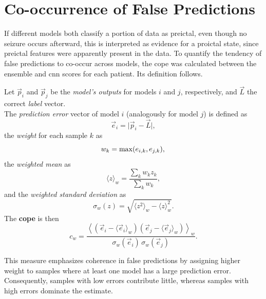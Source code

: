 \section{Co-occurrence of False Predictions} \label{sec:co-occurrence-of-false-predictions}
If different models both classify a portion of data as preictal, even though no seizure occurs afterward, this is interpreted as evidence for a proictal state, since preictal features were apparently present in the data.
To quantify the tendency of false predictions to co-occur across models, the \gls{cope} \parencite{muller_coherent_2022} was calculated between the ensemble and \gls{cnn} scores for each patient.
Its definition follows.

Let $\vec{p}_i$ and $\vec{p}_j$ be the \textit{model's outputs} for models $i$ and $j$, respectively, and $\vec{L}$ the correct \textit{label} vector.\\
The \textit{prediction error} vector of model $i$ (analogously for model $j$) is defined as
\begin{equation}
    \vec{e}_i=\lvert\vec{p}_i-\vec{L}\rvert,
\end{equation}
the \textit{weight} for each sample $k$ as
\begin{equation} 
    w_k = \max(e_{i,k},e_{j,k}),\\
\end{equation}
the \textit{weighted mean} as
\begin{equation}
    \langle z\rangle_w = \frac{\sum_k w_k z_k}{\sum_k w_k},
\end{equation}
and the \textit{weighted standard deviation} as
\begin{equation}
    \sigma_w(z) = \sqrt{\langle z^2\rangle_w-\langle z\rangle_w^2}.
\end{equation}
The \textbf{\gls{cope}} is then
\begin{equation} \label{eq:cope}
    c_w=\frac{\left\langle\left(\vec{e}_i-\langle \vec{e}_i\rangle_w\right)\left(\vec{e}_j-\langle \vec{e}_j\rangle_w\right)\right\rangle_w}
    {\sigma_w(\vec{e}_i)\,\sigma_w(\vec{e}_j)}.
\end{equation}

This measure emphasizes coherence in false predictions by assigning higher weight to samples where at least one model has a large prediction error.
Consequently, samples with low errors contribute little, whereas samples with high errors dominate the estimate.